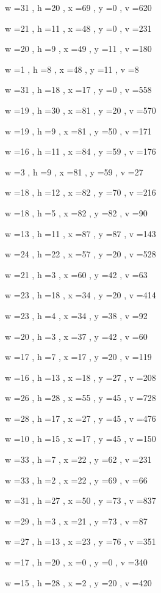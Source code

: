 \documentclass[11pt]{article}
\begin{document}
w =31 , h =20 , x =69 , y =0 , v =620
\par
w =21 , h =11 , x =48 , y =0 , v =231
\par
w =20 , h =9 , x =49 , y =11 , v =180
\par
w =1 , h =8 , x =48 , y =11 , v =8
\par
w =31 , h =18 , x =17 , y =0 , v =558
\par
w =19 , h =30 , x =81 , y =20 , v =570
\par
w =19 , h =9 , x =81 , y =50 , v =171
\par
w =16 , h =11 , x =84 , y =59 , v =176
\par
w =3 , h =9 , x =81 , y =59 , v =27
\par
w =18 , h =12 , x =82 , y =70 , v =216
\par
w =18 , h =5 , x =82 , y =82 , v =90
\par
w =13 , h =11 , x =87 , y =87 , v =143
\par
w =24 , h =22 , x =57 , y =20 , v =528
\par
w =21 , h =3 , x =60 , y =42 , v =63
\par
w =23 , h =18 , x =34 , y =20 , v =414
\par
w =23 , h =4 , x =34 , y =38 , v =92
\par
w =20 , h =3 , x =37 , y =42 , v =60
\par
w =17 , h =7 , x =17 , y =20 , v =119
\par
w =16 , h =13 , x =18 , y =27 , v =208
\par
w =26 , h =28 , x =55 , y =45 , v =728
\par
w =28 , h =17 , x =27 , y =45 , v =476
\par
w =10 , h =15 , x =17 , y =45 , v =150
\par
w =33 , h =7 , x =22 , y =62 , v =231
\par
w =33 , h =2 , x =22 , y =69 , v =66
\par
w =31 , h =27 , x =50 , y =73 , v =837
\par
w =29 , h =3 , x =21 , y =73 , v =87
\par
w =27 , h =13 , x =23 , y =76 , v =351
\par
w =17 , h =20 , x =0 , y =0 , v =340
\par
w =15 , h =28 , x =2 , y =20 , v =420
\par
\newpage
\end{document}
